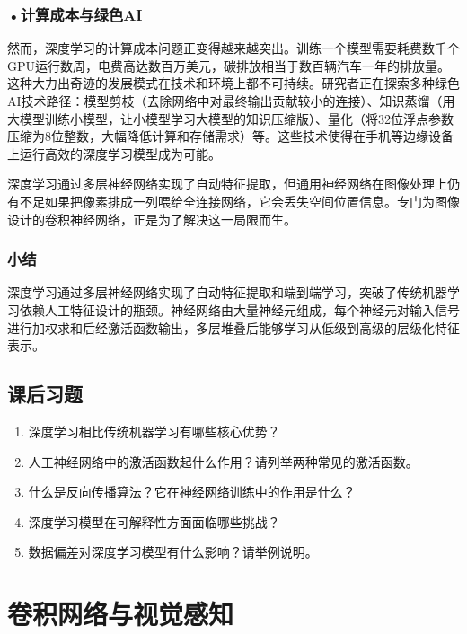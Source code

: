 \subsubsection*{\textbf{•计算成本与绿色AI}}

然而，深度学习的计算成本问题正变得越来越突出。训练一个模型需要耗费数千个GPU运行数周，电费高达数百万美元，碳排放相当于数百辆汽车一年的排放量。这种大力出奇迹的发展模式在技术和环境上都不可持续。研究者正在探索多种绿色AI技术路径：模型剪枝（去除网络中对最终输出贡献较小的连接）、知识蒸馏（用大模型训练小模型，让小模型学习大模型的知识压缩版）、量化（将32位浮点参数压缩为8位整数，大幅降低计算和存储需求）等。这些技术使得在手机等边缘设备上运行高效的深度学习模型成为可能。

深度学习通过多层神经网络实现了自动特征提取，但通用神经网络在图像处理上仍有不足如果把像素排成一列喂给全连接网络，它会丢失空间位置信息。专门为图像设计的卷积神经网络，正是为了解决这一局限而生。



\subsubsection*{小结}

深度学习通过多层神经网络实现了自动特征提取和端到端学习，突破了传统机器学习依赖人工特征设计的瓶颈。神经网络由大量神经元组成，每个神经元对输入信号进行加权求和后经激活函数输出，多层堆叠后能够学习从低级到高级的层级化特征表示。

\bigskip
\subsection*{课后习题}

\begin{enumerate}
\setlength{\itemsep}{6pt}
\item 深度学习相比传统机器学习有哪些核心优势？
\item 人工神经网络中的激活函数起什么作用？请列举两种常见的激活函数。
\item 什么是反向传播算法？它在神经网络训练中的作用是什么？
\item 深度学习模型在可解释性方面面临哪些挑战？
\item 数据偏差对深度学习模型有什么影响？请举例说明。
\end{enumerate}


\newpage
\section{卷积网络与视觉感知}

